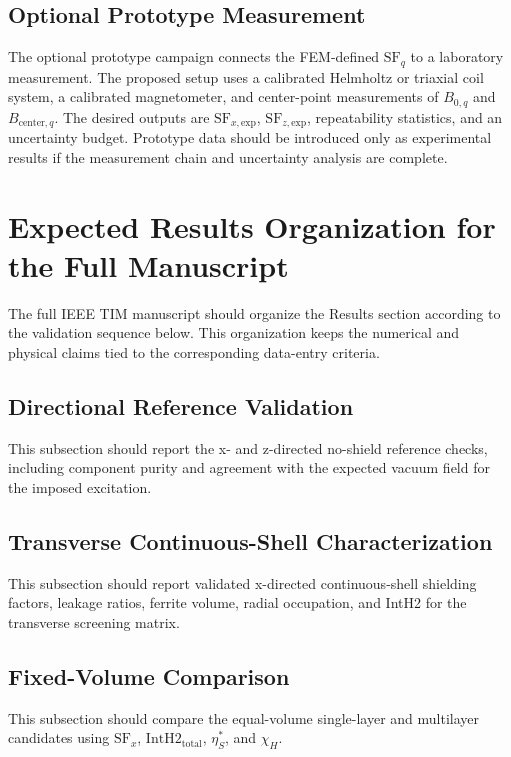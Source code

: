 ﻿\documentclass[letterpaper,journal]{IEEEtran}
\begin{document}
\subsection{Optional Prototype Measurement}

The optional prototype campaign connects the FEM-defined $\mathrm{SF}_q$ to a laboratory measurement. The proposed setup uses a calibrated Helmholtz or triaxial coil system, a calibrated magnetometer, and center-point measurements of $B_{0,q}$ and $B_{\mathrm{center},q}$. The desired outputs are $\mathrm{SF}_{x,\mathrm{exp}}$, $\mathrm{SF}_{z,\mathrm{exp}}$, repeatability statistics, and an uncertainty budget. Prototype data should be introduced only as experimental results if the measurement chain and uncertainty analysis are complete.

\section{Expected Results Organization for the Full Manuscript}

The full IEEE TIM manuscript should organize the Results section according to the validation sequence below. This organization keeps the numerical and physical claims tied to the corresponding data-entry criteria.

\subsection{Directional Reference Validation}

This subsection should report the x- and z-directed no-shield reference checks, including component purity and agreement with the expected vacuum field for the imposed excitation.

\subsection{Transverse Continuous-Shell Characterization}

This subsection should report validated x-directed continuous-shell shielding factors, leakage ratios, ferrite volume, radial occupation, and IntH2 for the transverse screening matrix.

\subsection{Fixed-Volume Comparison}

This subsection should compare the equal-volume single-layer and multilayer candidates using $\mathrm{SF}_x$, $\mathrm{IntH2}_{\mathrm{total}}$, $\eta_S^*$, and $\chi_H$.
\end{document}

